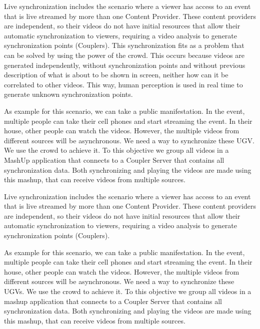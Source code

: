 Live synchronization includes the scenario where a viewer has access to an event that is live streamed by more than one Content Provider. These content providers are independent, so their videos do not have initial resources that allow their automatic synchronization to viewers, requiring a video analysis to generate synchronization points (Couplers). This synchronization fits as a problem that can be solved by using the power of the crowd. This occurs because videos are generated independently, without synchronization points and without previous description of what is about to be shown in screen, neither how can it be correlated to other videos. This way, human perception is used in real time to generate unknown synchronization points. 

As example for this scenario, we can take a public manifestation. In the event, multiple people can take their cell phones and start streaming the event. In their house, other people can watch the videos. However, the multiple videos from different sources will be asynchronous. We need a way to synchronize these UGV. We use the crowd to achieve it. To this objective we group all videos in a MashUp application that connects to a Coupler Server that contains all synchronization data. Both synchronizing and playing the videos are made using this mashup, that can receive videos from multiple sources.







Live synchronization includes the scenario where a viewer has access to an event that is live streamed by more than one Content Provider. These content providers are independent, so their videos do not have initial resources that allow their automatic synchronization to viewers, requiring a video analysis to generate synchronization points (Couplers).

As example for this scenario, we can take a public manifestation. In the event, multiple people can take their cell phones and start streaming the event. In their house, other people can watch the videos. However, the multiple videos from different sources will be asynchronous. We need a way to synchronize these UGVs. We use the crowd to achieve it. To this objective we group all videos in a mashup application that connects to a Coupler Server that contains all synchronization data. Both synchronizing and playing the videos are made using this mashup, that can receive videos from multiple sources.

